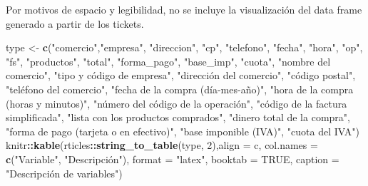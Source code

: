 \documentclass[,,,oneauthor,pdftex]{Definitions/mdpi}
\newenvironment{Shaded}{\begin{snugshade}}{\end{snugshade}}
\newcommand{\AttributeTok}[1]{\textcolor[rgb]{0.13,0.29,0.53}{#1}}
\newcommand{\ConstantTok}[1]{\textcolor[rgb]{0.56,0.35,0.01}{#1}}
\newcommand{\DecValTok}[1]{\textcolor[rgb]{0.00,0.00,0.81}{#1}}
\newcommand{\FunctionTok}[1]{\textcolor[rgb]{0.13,0.29,0.53}{\textbf{#1}}}
\newcommand{\NormalTok}[1]{#1}
\newcommand{\OtherTok}[1]{\textcolor[rgb]{0.56,0.35,0.01}{#1}}
\newcommand{\SpecialCharTok}[1]{\textcolor[rgb]{0.81,0.36,0.00}{\textbf{#1}}}
\newcommand{\StringTok}[1]{\textcolor[rgb]{0.31,0.60,0.02}{#1}}
\begin{document}
Por motivos de espacio y legibilidad, no se incluye la visualización del
data frame generado a partir de los tickets.

\begin{Shaded}
\begin{Highlighting}[]
\NormalTok{type }\OtherTok{\textless{}{-}} \FunctionTok{c}\NormalTok{(}\StringTok{"comercio"}\NormalTok{,}\StringTok{"empresa"}\NormalTok{, }\StringTok{"direccion"}\NormalTok{, }\StringTok{"cp"}\NormalTok{, }\StringTok{"telefono"}\NormalTok{, }\StringTok{"fecha"}\NormalTok{, }\StringTok{"hora"}\NormalTok{, }\StringTok{"op"}\NormalTok{, }\StringTok{"fs"}\NormalTok{, }\StringTok{"productos"}\NormalTok{, }\StringTok{"total"}\NormalTok{, }\StringTok{"forma\_pago"}\NormalTok{, }\StringTok{"base\_imp"}\NormalTok{, }\StringTok{"cuota"}\NormalTok{, }\StringTok{"nombre del comercio"}\NormalTok{, }\StringTok{"tipo y código de empresa"}\NormalTok{, }\StringTok{"dirección del comercio"}\NormalTok{, }\StringTok{"código postal"}\NormalTok{, }\StringTok{"teléfono del comercio"}\NormalTok{, }\StringTok{"fecha de la compra (día{-}mes{-}año)"}\NormalTok{, }\StringTok{"hora de la compra (horas y minutos)"}\NormalTok{, }\StringTok{"número del código de la operación"}\NormalTok{, }\StringTok{"código de la factura simplificada"}\NormalTok{, }\StringTok{"lista con los productos comprados"}\NormalTok{, }\StringTok{"dinero total de la compra"}\NormalTok{, }\StringTok{"forma de pago (tarjeta o en efectivo)"}\NormalTok{, }\StringTok{"base imponible (IVA)"}\NormalTok{, }\StringTok{"cuota del IVA"}\NormalTok{)}
\NormalTok{knitr}\SpecialCharTok{::}\FunctionTok{kable}\NormalTok{(rticles}\SpecialCharTok{::}\FunctionTok{string\_to\_table}\NormalTok{(type, }\DecValTok{2}\NormalTok{),}\AttributeTok{align =} \StringTok{\textquotesingle{}c\textquotesingle{}}\NormalTok{, }
             \AttributeTok{col.names =} \FunctionTok{c}\NormalTok{(}\StringTok{"Variable"}\NormalTok{, }\StringTok{"Descripción"}\NormalTok{),}
             \AttributeTok{format =} \StringTok{"latex"}\NormalTok{, }\AttributeTok{booktab =} \ConstantTok{TRUE}\NormalTok{, }
             \AttributeTok{caption =} \StringTok{"Descripción de variables"}\NormalTok{) }
\end{Highlighting}
\end{Shaded}
\end{document}
